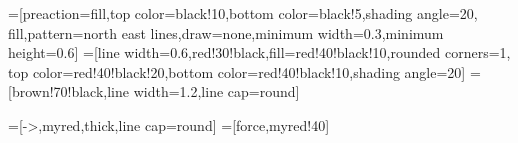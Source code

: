\tikzset{>=latex} %
\contourlength{1.2pt}

=[preaction={fill,top color=black!10,bottom color=black!5,shading angle=20},
                    fill,pattern=north east lines,draw=none,minimum width=0.3,minimum height=0.6]
=[line width=0.6,red!30!black,fill=red!40!black!10,rounded corners=1,
                  top color=red!40!black!20,bottom color=red!40!black!10,shading angle=20]
=[brown!70!black,line width=1.2,line cap=round] %

=[->,myred,thick,line cap=round]
=[force,myred!40]
\newcommand{\vbF}{\vb{F}}

\def\h{0.7} %
\def\w{0.9} %


